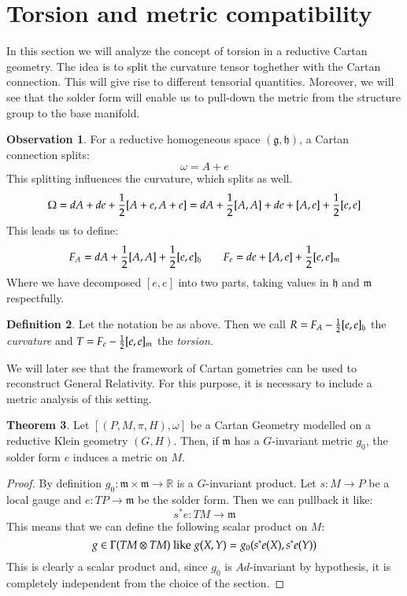 \documentclass[12pt,a4paper]{report}
\theoremstyle{definition}
\newtheorem{Def}{Definition}[chapter]
\theoremstyle{Theorem}
\newtheorem{Theo}[Def]{Theorem}
\theoremstyle{break}
\theoremstyle{definition}
\newtheorem{Obs}[Def]{Observation}
\begin{document}
	\section{Torsion and metric compatibility}
	In this section we will analyze the concept of torsion in a reductive Cartan geometry. The idea is to split the curvature tensor toghether with the Cartan connection. This will give rise to different tensorial quantities. Moreover, we will see that the solder form will enable us to pull-down the metric from the structure group to the base manifold. 
	\begin{Obs}
		For a reductive homogeneous space $(\mathfrak{g},\mathfrak{h})$, a Cartan connection splits:
		$$\omega=A+e$$
		This splitting influences the curvature, which splits as well.
		$$\Omega=dA+de+{1\over 2}[A+e,A+e]=dA+{1\over 2}[A,A]+de+[A,e]+{1\over 2}[e,e]$$
		This leads us to define:
		$$F_A=dA+{1\over 2}[A,A]+{1\over 2}[e,e]_{\mathfrak{h}}\hspace{20 pt}F_e=de+[A,e]+{1\over 2}[e,e]_{\mathfrak{m}}$$
		Where we have decomposed $[e,e]$ into two parts, taking values in $\mathfrak{h}$ and $\mathfrak{m}$ respectfully.
	\end{Obs}
	\begin{Def}
		Let the notation be as above. Then we call $R=F_A-{1\over 2}[e,e]_\mathfrak{h}$ the \textit{curvature }and $T=F_e-{1\over 2}[e,e]_\mathfrak{m}$ the \textit{torsion}. 
	\end{Def}
	We will later see that the framework of Cartan gometries can be used to reconstruct General Relativity. For this purpose, it is necessary to include a metric analysis of this setting.
	\begin{Theo}
		Let $[(P,M,\pi,H),\omega]$ be a Cartan Geometry modelled on a reductive Klein geometry $(G,H)$. Then, if $\mathfrak{m}$ has a $G$-invariant metric $g_0$, the solder form $e$ induces a metric on $M$. 
	\end{Theo}
	\begin{proof}
		By definition $g_0:\mathfrak{m}\times \mathfrak{m}\rightarrow \mathbb{R}$ is a $G$-invariant product. Let $s:M\rightarrow P$ be a local gauge and $e:TP\rightarrow \mathfrak{m}$ be the solder form. Then we can pullback it like:
		$$s^*e:TM\rightarrow \mathfrak{m}$$
		This means that we can define the following scalar product on $M$:
		$$g\in\Gamma(TM\otimes TM)\hbox{ like }g(X,Y)=g_0(s^*e(X),s^*e(Y))$$
		This is clearly a scalar product and, since $g_0$ is $Ad$-invariant by hypothesis, it is completely independent from the choice of the section.
	\end{proof}
\end{document}
